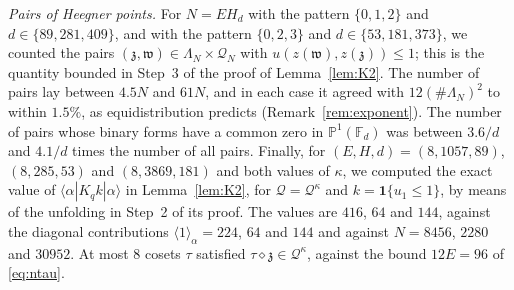 \documentclass[11pt]{amsart}
\theoremstyle{remark}
\theoremstyle{definition}
\numberwithin{equation}{section}
\newcommand{\Qc}{\mathcal{Q}}
\newcommand{\gz}{\mathfrak{z}}
\newcommand{\gw}{\mathfrak{w}}
\newcommand{\one}{\mathbf{1}}
\newcommand{\br}[1]{\langle #1\rangle}
\begin{document}
\emph{Pairs of Heegner points.} For $N=EH_d$ with the pattern $\{0,1,2\}$ and $d\in\{89,281,409\}$, and with the pattern $\{0,2,3\}$ and $d\in\{53,181,373\}$, we counted the pairs $(\gz,\gw)\in\Lambda_N\times\Qc_N$ with $u(z(\gw),z(\gz))\le1$; this is the quantity bounded in Step~3 of the proof of Lemma~\ref{lem:K2}. The number of pairs lay between $4.5N$ and $61N$, and in each case it agreed with $12(\#\Lambda_N)^2$ to within $1.5\%$, as equidistribution predicts (Remark~\ref{rem:exponent}). The number of pairs whose binary forms have a common zero in $\mathbb P^1(\mathbb F_d)$ was between $3.6/d$ and $4.1/d$ times the number of all pairs. Finally, for $(E,H,d)=(8,1057,89)$, $(8,285,53)$ and $(8,3869,181)$ and both values of $\kappa$, we computed the exact value of $\br{\alpha|K_qk|\alpha}$ in Lemma~\ref{lem:K2}, for $\Qc=\Qc^\kappa$ and $k=\one\{u_1\le1\}$, by means of the unfolding in Step~2 of its proof. The values are $416$, $64$ and $144$, against the diagonal contributions $\br1_\alpha=224$, $64$ and $144$ and against $N=8456$, $2280$ and $30952$. At most $8$ cosets $\tau$ satisfied $\tau\diamond\gz\in\Qc^\kappa$, against the bound $12E=96$ of \eqref{eq:ntau}.
\end{document}
